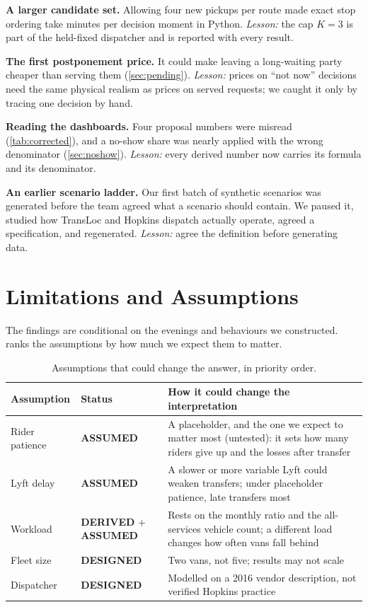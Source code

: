 \documentclass{article}
\newcommand{\lab}[1]{{\footnotesize\textsf{\textbf{#1}}}}
\newcommand{\DER}{\lab{DERIVED}}
\newcommand{\ASM}{\lab{ASSUMED}}
\newcommand{\DES}{\lab{DESIGNED}}
\begin{document}
\textbf{A larger candidate set.} Allowing four new pickups per route made exact stop ordering take minutes per decision moment in Python. \emph{Lesson:} the cap $K=3$ is part of the held-fixed dispatcher and is reported with every result.

\textbf{The first postponement price.} It could make leaving a long-waiting party cheaper than serving them (\cref{sec:pending}). \emph{Lesson:} prices on ``not now'' decisions need the same physical realism as prices on served requests; we caught it only by tracing one decision by hand.

\textbf{Reading the dashboards.} Four proposal numbers were misread (\cref{tab:corrected}), and a no-show share was nearly applied with the wrong denominator (\cref{sec:noshow}). \emph{Lesson:} every derived number now carries its formula and its denominator.

\textbf{An earlier scenario ladder.} Our first batch of synthetic scenarios was generated before the team agreed what a scenario should contain. We paused it, studied how TransLoc and Hopkins dispatch actually operate, agreed a specification, and regenerated. \emph{Lesson:} agree the definition before generating data.

\section{Limitations and Assumptions}\label{sec:limits}

The findings are conditional on the evenings and behaviours we constructed.  ranks the assumptions by how much we expect them to matter.

\begin{table}[t]
\centering\small
\caption{Assumptions that could change the answer, in priority order.}\label{tab:assumptions}
\begin{tabularx}{\columnwidth}{@{}P{1.45cm}P{1.75cm}L@{}}
\toprule
\textbf{Assumption} & \textbf{Status} & \textbf{How it could change the interpretation}\\
\midrule
Rider patience & \ASM & A placeholder, and the one we expect to matter most (untested): it sets how many riders give up and the losses after transfer\\
Lyft delay & \ASM & A slower or more variable Lyft could weaken transfers; under placeholder patience, late transfers most\\
Workload & \DER{} + \ASM & Rests on the monthly ratio and the all-services vehicle count; a different load changes how often vans fall behind\\
Fleet size & \DES & Two vans, not five; results may not scale\\
Dispatcher & \DES & Modelled on a 2016 vendor description, not verified Hopkins practice\\
\bottomrule
\end{tabularx}
\end{table}
\end{document}
